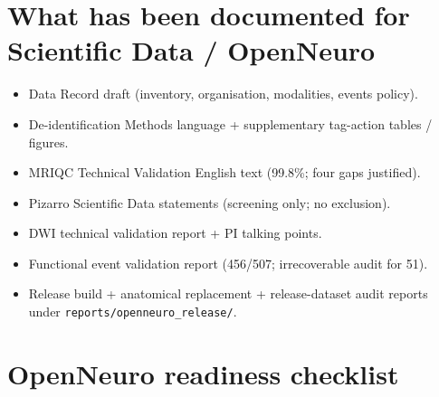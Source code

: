 \documentclass[11pt,a4paper]{article}
\begin{document}
\section{What has been documented for Scientific Data / OpenNeuro}

\begin{itemize}
\item Data Record draft (inventory, organisation, modalities, events policy).
\item De-identification Methods language + supplementary tag-action tables / figures.
\item MRIQC Technical Validation English text (99.8\%; four gaps justified).
\item Pizarro Scientific Data statements (screening only; no exclusion).
\item DWI technical validation report + PI talking points.
\item Functional event validation report (456/507; irrecoverable audit for 51).
\item Release build + anatomical replacement + release-dataset audit reports under
  \texttt{reports/openneuro\_release/}.
\end{itemize}

\section{OpenNeuro readiness checklist}
\end{document}
